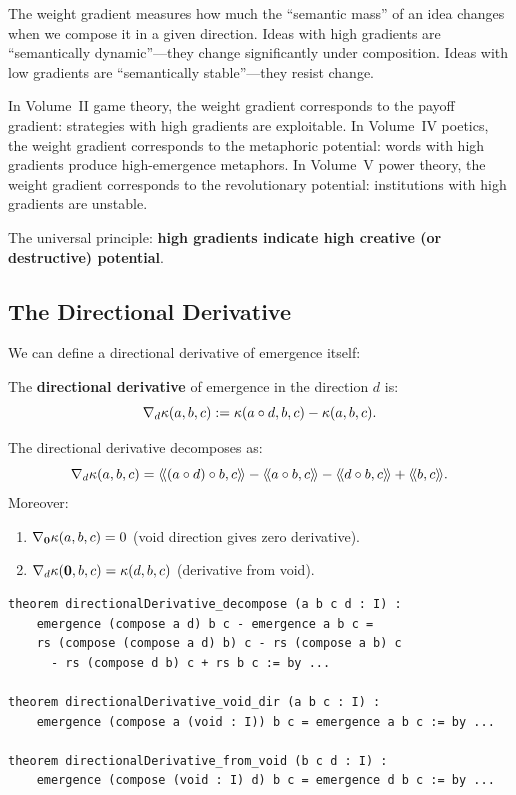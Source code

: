 \begin{interpretation}
The weight gradient measures how much the ``semantic mass'' of an idea
changes when we compose it in a given direction. Ideas with high gradients
are ``semantically dynamic''---they change significantly under composition.
Ideas with low gradients are ``semantically stable''---they resist change.

In Volume~II game theory, the weight gradient corresponds to the payoff
gradient: strategies with high gradients are exploitable. In Volume~IV
poetics, the weight gradient corresponds to the metaphoric potential: words
with high gradients produce high-emergence metaphors. In Volume~V power
theory, the weight gradient corresponds to the revolutionary potential:
institutions with high gradients are unstable.

The universal principle: \textbf{high gradients indicate high creative (or
destructive) potential}.
\end{interpretation}

\subsection{The Directional Derivative}

We can define a directional derivative of emergence itself:

\begin{definition}
\label{def:directional-derivative}
The \textbf{directional derivative} of emergence in the direction $d$ is:
\[
  \nabla_d \kappa(a, b, c) := \kappa(a \circ d, b, c) - \kappa(a, b, c).
\]
\end{definition}

\begin{theorem}
\label{thm:directional-derivative-decomp}
The directional derivative decomposes as:
\[
  \nabla_d \emerge(a, b, c) = \rs{(a \compose d) \compose b}{c}
    - \rs{a \compose b}{c} - \rs{d \compose b}{c} + \rs{b}{c}.
\]
Moreover:
\begin{enumerate}
  \item $\nabla_{\mathbf{0}} \kappa(a, b, c) = 0$ (void direction gives zero derivative).
  \item $\nabla_d \kappa(\mathbf{0}, b, c) = \kappa(d, b, c)$ (derivative from void).
\end{enumerate}
\end{theorem}

\begin{lstlisting}[caption={Directional derivative (IDT\_v3\_Emergence.lean)}]
theorem directionalDerivative_decompose (a b c d : I) :
    emergence (compose a d) b c - emergence a b c =
    rs (compose (compose a d) b) c - rs (compose a b) c
      - rs (compose d b) c + rs b c := by ...

theorem directionalDerivative_void_dir (a b c : I) :
    emergence (compose a (void : I)) b c = emergence a b c := by ...

theorem directionalDerivative_from_void (b c d : I) :
    emergence (compose (void : I) d) b c = emergence d b c := by ...
\end{lstlisting}

